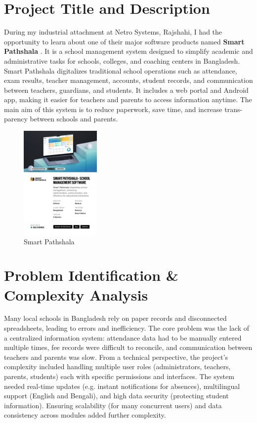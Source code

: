 \documentclass[12pt,a4paper]{report}
\newcommand{\project}[1]{\textcolor{projectcolor}{\textbf{#1}}}
\let\oldcite\cite
\renewcommand{\cite}[1]{\textcolor{impactcolor}{\oldcite{#1}}}
\begin{document}
\section{Project Title and Description}
During my industrial attachment at Netro Systems, Rajshahi, I had the opportunity to learn about one of their major software products named \project{Smart Pathshala} \cite{ref2}. It is a school
management system designed to simplify academic and administrative tasks for schools,
colleges, and coaching centers in Bangladesh.
Smart Pathshala digitalizes traditional school operations such as attendance, exam
results, teacher management, accounts, student records, and communication between
teachers, guardians, and students. It includes a web portal and Android app, making it
easier for teachers and parents to access information anytime.
The main aim of this system is to reduce paperwork, save time, and increase trans-
parency between schools and parents.

\begin{figure}[h!] 
\centering \includegraphics[width=0.35\textwidth]{Figures/smart_pathshala.png} \caption{Smart Pathshala}
\end{figure}

\section{Problem Identification \& Complexity Analysis}
Many local schools in Bangladesh rely on paper records and disconnected spreadsheets, leading to errors and inefficiency. The core problem was the lack of a centralized information system: attendance data had to be manually entered multiple times, fee records were difficult to reconcile, and communication between teachers and parents was slow. From a technical perspective, the project’s complexity included handling multiple user roles (administrators, teachers, parents, students) each with specific permissions and interfaces. The system needed real-time updates (e.g. instant notifications for absences), multilingual support (English and Bengali), and high data security (protecting student information). Ensuring scalability (for many concurrent users) and data consistency across modules added further complexity.
\end{document}
